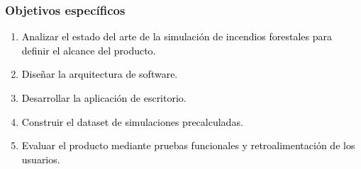 \subsubsection{Objetivos específicos}\label{sec:objetivos}
\begin{enumerate}
\item \textcolor{black}{Analizar el estado del arte de la simulación de incendios forestales para definir el alcance del producto.}
\item \textcolor{black}{Diseñar la arquitectura de software.}
\item \textcolor{black}{Desarrollar la aplicación de escritorio.}
\item \textcolor{black}{Construir el dataset de simulaciones precalculadas.}
\item \textcolor{black}{Evaluar el producto mediante pruebas funcionales y retroalimentación de los usuarios.}
\end{enumerate}

